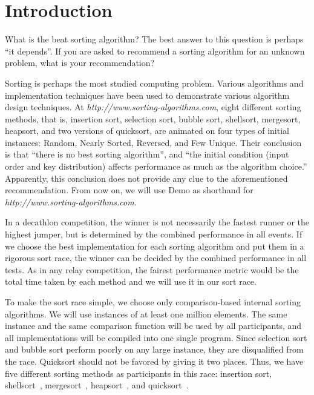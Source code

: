 \documentclass[AMA,STIX1COL]{WileyNJD-v2}
\begin{document}
\section{Introduction}\label{sec1}

What is the beat sorting algorithm? 
The best answer to this question is perhaps ``it depends”.  
If you are asked to recommend a sorting algorithm for an unknown problem, what is your recommendation?

Sorting is perhaps the most studied computing problem. 
Various algorithms and implementation techniques have been used to demonstrate various algorithm design techniques.  
At \textit{http://www.sorting-algorithms.com}, eight different sorting methods, that is, insertion sort, selection sort, bubble sort, shellsort, mergesort, heapsort, and two versions of quicksort, are animated on four types of initial instances: Random, Nearly Sorted, Reversed, and Few Unique. 
Their conclusion is that “there is no best sorting algorithm”, and “the initial condition (input order and key distribution) affects performance as much as the algorithm choice.” 
Apparently, this conclusion does not provide any clue to the aforementioned recommendation. 
From now on, we will use Demo as shorthand for \textit{http://www.sorting-algorithms.com}.

In a decathlon competition, the winner is not necessarily the fastest runner or the highest jumper, but is determined by the combined performance in all events. 
If we choose the best implementation for each sorting algorithm and put them in a rigorous sort race, the winner can be decided by the combined performance in all tests. 
As in any relay competition, the fairest performance metric would be the total time taken by each method and we will use it in our sort race.

To make the sort race simple, we choose only comparison-based internal sorting algorithms. 
We will use instances of at least one million elements. 
The same instance and the same comparison function will be used by all participants, and all implementations will be compiled into one single program. 
Since selection sort and bubble sort perform poorly on any large instance, they are disqualified from the race. Quicksort should not be favored by giving it two places.  
Thus, we have five different sorting methods as participants in this race: insertion sort, shellsort~\cite{knuth97}, mergesort~\cite{mcilroy1993optimistic}, heapsort~\cite{williams1964algorithm}, and quicksort~\cite{hoare1961algorithm}.
\end{document}
